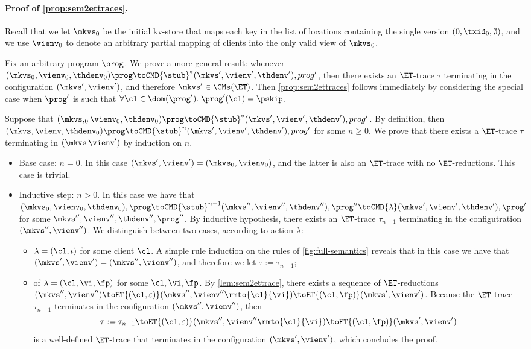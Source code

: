 \paragraph{Proof of \cref{prop:sem2ettraces}.} 
Recall that we let $\mkvs_{0}$ be the initial kv-store that maps 
each key in the list of locations containing the single version $(0, \txid_{0}, \emptyset)$, 
and we use $\vienv_{0}$ to denote an arbitrary partial mapping of clients into the only valid view 
of $\mkvs_{0}$.

Fix an arbitrary program $\prog$. We prove a more general result: 
whenever $(\mkvs_{0}, \vienv_{0}, \thdenv_{0}) \prog \toCMD{\stub}^{\ast} (\mkvs', \vienv', \thdenv'), prog'$, 
then there exists an $\ET$-trace $\tau$ terminating in the configuration $(\mkvs', \vienv')$, 
and therefore $\mkvs' \in \CMs(\ET)$.
Then \cref{prop:sem2ettraces} follows immediately by considering the 
special case when $\prog'$ is such that $\forall \cl \in \dom(\prog').\; \prog'(\cl) = \pskip$.

Suppose that $(\mkvs,_{0} \vienv_{0}, \thdenv_{0}) \prog \toCMD{\stub}^{\ast} (\mkvs', \vienv', \thdenv'), prog'$. 
By definition, then $(\mkvs, \vienv, \thdenv_{0}) \prog \toCMD{\stub}^{n} (\mkvs', \vienv', \thdenv'), prog'$ 
for some $n \geq 0$. We prove that there exists a $\ET$-trace $\tau$ terminating in $(\mkvs\, \vienv')$ 
by induction on $n$. 
\begin{itemize}
\item Base case: $n = 0$. In this case $(\mkvs', \vienv') = (\mkvs_{0}, \vienv_{0})$, and the latter 
is also an $\ET$-trace with no $\ET$-reductions. This case is trivial. 
\item Inductive step: $n > 0$. In this case we have that $(\mkvs_{0}, \vienv_{0}, \thdenv_{0}), \prog \toCMD{\stub}^{n-1} (\mkvs'', \vienv'', \thdenv''), \prog''
\toCMD{\lambda} (\mkvs', \vienv', \thdenv'), \prog'$ for some $\mkvs'', \vienv'', \thdenv'',\prog''$. By inductive hypothesis, 
there exists an $\ET$-trace $\tau_{n-1}$ terminating in the configutration $(\mkvs'', \vienv'')$. 
We distinguish between two cases, according to action $\lambda$: 
\begin{itemize}
\item $\lambda = (\cl, \iota)$ for some client $\cl$. A simple rule induction on the rules of \cref{fig:full-semantics} 
reveals that in this case we have that $(\mkvs', \vienv') = (\mkvs'', \vienv'')$, and therefore we let $\tau := \tau_{n-1}$; 
\item of $\lambda = (\cl, \vi, \fp)$ for some $\cl, \vi, \fp$. By \cref{lem:sem2ettrace}, there exists a sequence 
of $\ET$-reductions $(\mkvs'', \vienv'') \toET{(\cl, \varepsilon)} (\mkvs'', \vienv''\rmto{\cl}{\vi}) \toET{(\cl, \fp)} (\mkvs', \vienv')$. 
Because the $\ET$-trace $\tau_{n-1}$ terminates in the configuration $(\mkvs'', \vienv'')$, then
\[
\tau := \tau_{n-1} \toET{(\cl, \varepsilon)} (\mkvs'', \vienv''\rmto{\cl}{\vi}) \toET{(\cl, \fp)} (\mkvs', \vienv')
\]
is a well-defined $\ET$-trace that terminates in the configuration $(\mkvs', \vienv')$, which concludes the proof.
\end{itemize}
\end{itemize}

